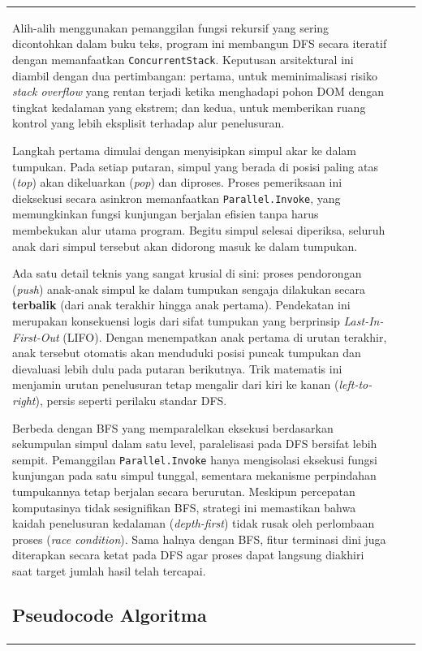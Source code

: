 \documentclass[12pt]{article}
\begin{document}
\begin{table}[H]
\begin{tabular}{|l|c|c|}
\begin{document}
Alih-alih menggunakan pemanggilan fungsi rekursif yang sering dicontohkan dalam buku teks, program ini membangun DFS secara iteratif dengan memanfaatkan \texttt{ConcurrentStack}. Keputusan arsitektural ini diambil dengan dua pertimbangan: pertama, untuk meminimalisasi risiko \textit{stack overflow} yang rentan terjadi ketika menghadapi pohon DOM dengan tingkat kedalaman yang ekstrem; dan kedua, untuk memberikan ruang kontrol yang lebih eksplisit terhadap alur penelusuran.

Langkah pertama dimulai dengan menyisipkan simpul akar ke dalam tumpukan. Pada setiap putaran, simpul yang berada di posisi paling atas (\textit{top}) akan dikeluarkan (\textit{pop}) dan diproses. Proses pemeriksaan ini dieksekusi secara asinkron memanfaatkan \texttt{Parallel.Invoke}, yang memungkinkan fungsi kunjungan berjalan efisien tanpa harus membekukan alur utama program. Begitu simpul selesai diperiksa, seluruh anak dari simpul tersebut akan didorong masuk ke dalam tumpukan.

Ada satu detail teknis yang sangat krusial di sini: proses pendorongan (\textit{push}) anak-anak simpul ke dalam tumpukan sengaja dilakukan secara \textbf{terbalik} (dari anak terakhir hingga anak pertama). Pendekatan ini merupakan konsekuensi logis dari sifat tumpukan yang berprinsip \textit{Last-In-First-Out} (LIFO). Dengan menempatkan anak pertama di urutan terakhir, anak tersebut otomatis akan menduduki posisi puncak tumpukan dan dievaluasi lebih dulu pada putaran berikutnya. Trik matematis ini menjamin urutan penelusuran tetap mengalir dari kiri ke kanan (\textit{left-to-right}), persis seperti perilaku standar DFS.

Berbeda dengan BFS yang memparalelkan eksekusi berdasarkan sekumpulan simpul dalam satu level, paralelisasi pada DFS bersifat lebih sempit. Pemanggilan \texttt{Parallel.Invoke} hanya mengisolasi eksekusi fungsi kunjungan pada satu simpul tunggal, sementara mekanisme perpindahan tumpukannya tetap berjalan secara berurutan. Meskipun percepatan komputasinya tidak sesignifikan BFS, strategi ini memastikan bahwa kaidah penelusuran kedalaman (\textit{depth-first}) tidak rusak oleh perlombaan proses (\textit{race condition}). Sama halnya dengan BFS, fitur terminasi dini juga diterapkan secara ketat pada DFS agar proses dapat langsung diakhiri saat target jumlah hasil telah tercapai.

\subsection{Pseudocode Algoritma}


\end{document}
\end{tabular}
\end{table}
\end{document}
